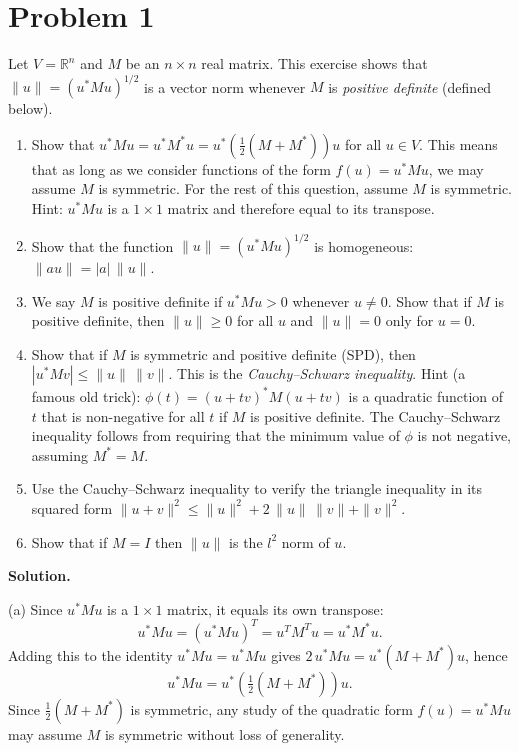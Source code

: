 \documentclass[letterpaper, 11pt]{article}
\newcommand{\R}{\mathbb{R}}   %
\newcommand{\1}{\mathds{1}}	%
\theoremstyle{definition}
\begin{document}
\section*{Problem 1}

Let $V = \R^n$ and $M$ be an $n \times n$ real matrix. This exercise shows that $\|u\| = (u^*Mu)^{1/2}$ is a vector norm whenever $M$ is \textit{positive definite} (defined below).

\begin{enumerate}[label=(\alph*)]
\item Show that $u^*Mu = u^*M^*u = u^*\left(\frac{1}{2}(M + M^*)\right)u$ for all $u \in V$. This means that as long as we consider functions of the form $f(u) = u^*Mu$, we may assume $M$ is symmetric. For the rest of this question, assume $M$ is symmetric. Hint: $u^*Mu$ is a $1 \times 1$ matrix and therefore equal to its transpose.

\item Show that the function $\|u\| = (u^*Mu)^{1/2}$ is homogeneous: $\|au\| = |a|\,\|u\|$.

\item We say $M$ is positive definite if $u^*Mu > 0$ whenever $u \neq 0$. Show that if $M$ is positive definite, then $\|u\| \geq 0$ for all $u$ and $\|u\| = 0$ only for $u = 0$.

\item Show that if $M$ is symmetric and positive definite (SPD), then $|u^*Mv| \leq \|u\|\,\|v\|$. This is the \textit{Cauchy--Schwarz inequality}. Hint (a famous old trick): $\phi(t) = (u + tv)^*M(u + tv)$ is a quadratic function of $t$ that is non-negative for all $t$ if $M$ is positive definite. The Cauchy--Schwarz inequality follows from requiring that the minimum value of $\phi$ is not negative, assuming $M^* = M$.

\item Use the Cauchy--Schwarz inequality to verify the triangle inequality in its squared form $\|u + v\|^2 \leq \|u\|^2 + 2\,\|u\|\,\|v\| + \|v\|^2$.

\item Show that if $M = I$ then $\|u\|$ is the $l^2$ norm of $u$.
\end{enumerate}

\medskip

\textbf{Solution.}

(a) Since $u^*Mu$ is a $1 \times 1$ matrix, it equals its own transpose:
\[
u^*Mu = (u^*Mu)^T = u^T M^T u = u^* M^* u.
\]
Adding this to the identity $u^*Mu = u^*Mu$ gives $2\,u^*Mu = u^*(M + M^*)u$, hence
\[
u^*Mu = u^*\!\left(\tfrac{1}{2}(M + M^*)\right)u.
\]
Since $\frac{1}{2}(M + M^*)$ is symmetric, any study of the quadratic form $f(u) = u^*Mu$ may assume $M$ is symmetric without loss of generality.
\end{document}
